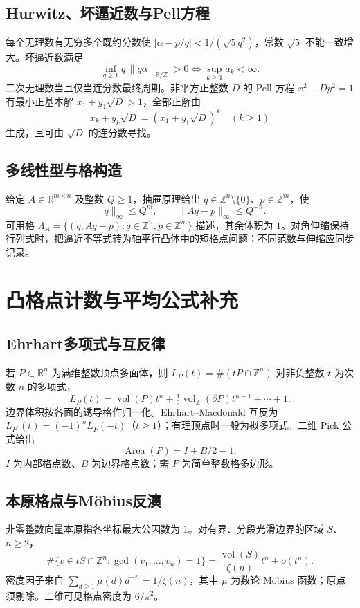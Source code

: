 \documentclass[../main.tex]{subfiles}
\begin{document}
\subsection{Hurwitz、坏逼近数与Pell方程}
每个无理数有无穷多个既约分数使 $|\alpha-p/q|<1/(\sqrt5q^2)$，常数 $\sqrt5$ 不能一致增大。坏逼近数满足
\[
\inf_{q\ge1}q\,\|q\alpha\|_{\mathbb R/\mathbb Z}>0
\iff\sup_{k\ge1}a_k<\infty.
\]
二次无理数当且仅当连分数最终周期。非平方正整数 $D$ 的 Pell 方程 $x^2-Dy^2=1$ 有最小正基本解 $x_1+y_1\sqrt D>1$，全部正解由
\[
x_k+y_k\sqrt D=(x_1+y_1\sqrt D)^k\quad(k\ge1)
\]
生成，且可由 $\sqrt D$ 的连分数寻找。
\subsection{多线性型与格构造}
给定 $A\in\mathbb R^{m\times n}$ 及整数 $Q\ge1$，抽屉原理给出 $q\in\mathbb Z^n\setminus\{0\}$、$p\in\mathbb Z^m$，使
\[
\|q\|_\infty\le Q^m,\qquad\|Aq-p\|_\infty\le Q^{-n}.
\]
可用格 $\Lambda_A=\{(q,Aq-p):q\in\mathbb Z^n,p\in\mathbb Z^m\}$ 描述，其余体积为 $1$。对角伸缩保持行列式时，把逼近不等式转为轴平行凸体中的短格点问题；不同范数与伸缩应同步记录。
\section{凸格点计数与平均公式补充}
\subsection{Ehrhart多项式与互反律}
若 $P\subset\mathbb R^n$ 为满维整数顶点多面体，则 $L_P(t)=\#(tP\cap\mathbb Z^n)$ 对非负整数 $t$ 为次数 $n$ 的多项式，
\[
L_P(t)=\operatorname{vol}(P)t^n+\tfrac12\operatorname{vol}_{\mathbb Z}(\partial P)t^{n-1}+\cdots+1.
\]
边界体积按各面的诱导格作归一化。Ehrhart--Macdonald 互反为 $L_{P^\circ}(t)=(-1)^nL_P(-t)$（$t\ge1$）；有理顶点时一般为拟多项式。二维 Pick 公式给出
\[
\operatorname{Area}(P)=I+B/2-1,
\]
$I$ 为内部格点数、$B$ 为边界格点数；需 $P$ 为简单整数格多边形。
\subsection{本原格点与Möbius反演}
非零整数向量本原指各坐标最大公因数为 $1$。对有界、分段光滑边界的区域 $S$、$n\ge2$，
\[
\#\{v\in tS\cap\mathbb Z^n:\gcd(v_1,\ldots,v_n)=1\}
=\frac{\operatorname{vol}(S)}{\zeta(n)}t^n+o(t^n).
\]
密度因子来自 $\sum_{d\ge1}\mu(d)d^{-n}=1/\zeta(n)$，其中 $\mu$ 为数论 Möbius 函数；原点须剔除。二维可见格点密度为 $6/\pi^2$。
\end{document}
